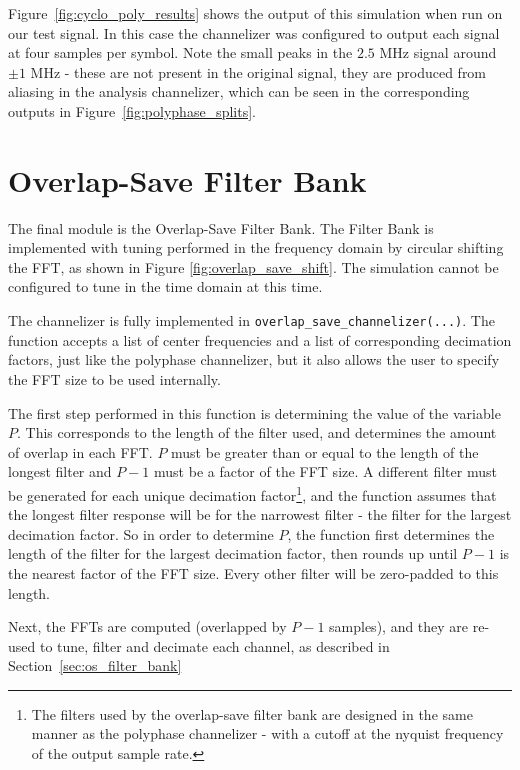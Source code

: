 \documentclass[12pt]{report}
\begin{document}
Figure~\ref{fig:cyclo_poly_results} shows the output of this simulation when
run on our test signal. In this case the channelizer was configured to output
each signal at four samples per symbol. Note the small peaks in the $2.5$ MHz
signal around $\pm1$ MHz - these are not present in the original signal, they
are produced from aliasing in the analysis channelizer, which can be seen in
the corresponding outputs in Figure~\ref{fig:polyphase_splits}.

\section{Overlap-Save Filter Bank}
\label{sec:sim_os}
The final module is the Overlap-Save Filter Bank. The Filter Bank is
implemented with tuning performed in the frequency domain by circular shifting
the FFT, as shown in Figure \ref{fig:overlap_save_shift}. The
simulation cannot be configured to tune in the time domain at this time.

The channelizer is fully implemented in \texttt{overlap\_save\_channelizer(...)}.
The function accepts a list of center frequencies and a list of corresponding decimation factors, just like the polyphase channelizer, but it also allows the user to specify the FFT size to be used internally.

The first step performed in this function is determining the value of the
variable $P$. This corresponds to the length of the filter used, and determines
the amount of overlap in each FFT. $P$ must be greater than or equal to the
length of the longest filter and $P-1$ must be a factor of the FFT size.
A different filter must be generated for each unique decimation
factor\footnote{The filters used by the overlap-save filter bank are designed
    in the same manner as the polyphase channelizer - with a cutoff at the
nyquist frequency of the output sample rate.}, and the function assumes that
the longest filter response will be for the narrowest filter - the filter for
the largest decimation factor. So in order to determine $P$, the function first
determines the length of the filter for the largest decimation factor, then
rounds up until $P-1$ is the nearest factor of the FFT size. Every other filter
will be zero-padded to this length.

Next, the FFTs are computed (overlapped by $P-1$ samples), and they are re-used
to tune, filter and decimate each channel, as described in
Section~\ref{sec:os_filter_bank}
\end{document}
